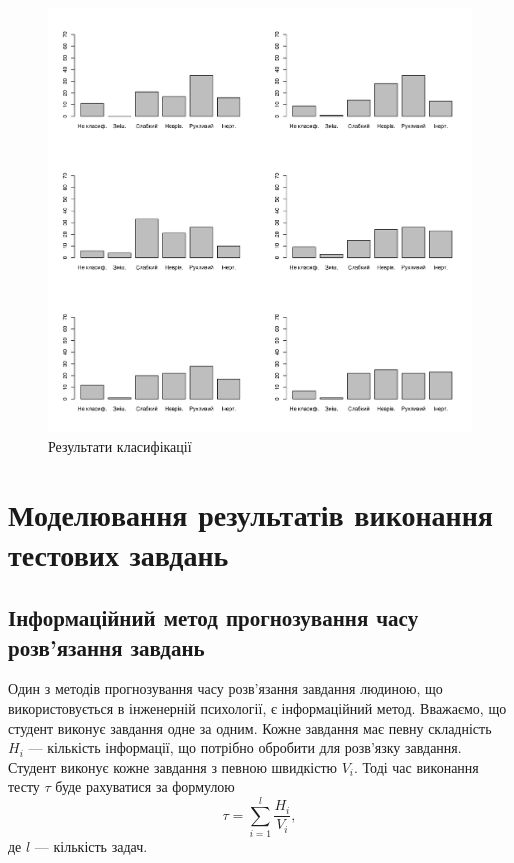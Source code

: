 \begin{figure}[h!]
  \centering
  \includegraphics[width=\textwidth]{images/poisson_types}
  \caption{Результати класифікації}
  \label{fig:tapping:poisson:types}
\end{figure}

\section{Моделювання результатів виконання тестових завдань}

\subsection{Інформаційний метод прогнозування часу розв’язання завдань}

Один з методів прогнозування часу розв’язання завдання людиною,
що використовується в інженерній психології, є інформаційний метод.
Вважаємо, що студент виконує завдання одне за одним.
Кожне завдання має певну складність $H_i$ --- кількість інформації,
що потрібно обробити для розв’язку завдання.
Студент виконує кожне завдання з певною швидкістю $V_i$.
Тоді час виконання тесту $\tau$ буде рахуватися за формулою
\begin{equation*}
  \tau = \sum_{i=1}^{l}\frac{H_i}{V_i},
\end{equation*}
де $l$ --- кількість задач. \cite{Lomov:1982}

